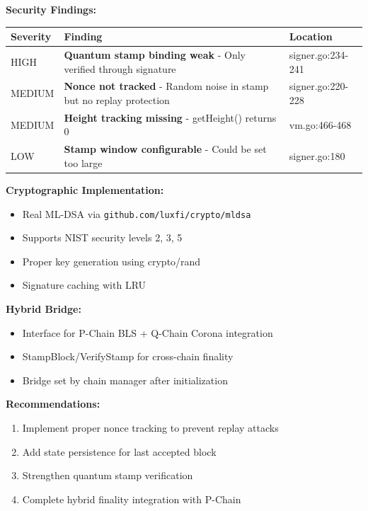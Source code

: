 \documentclass[
]{article}
\newcounter{none} %
\providecommand{\tightlist}{%
  \setlength{\itemsep}{0pt}\setlength{\parskip}{0pt}}
\begin{document}
\textbf{Security Findings:}

{\def\LTcaptype{none} %
\begin{longtable}[]{@{}lll@{}}
\toprule\noalign{}
Severity & Finding & Location \\
\midrule\noalign{}
\endhead
\bottomrule\noalign{}
\endlastfoot
HIGH & \textbf{Quantum stamp binding weak} - Only verified through
signature & signer.go:234-241 \\
MEDIUM & \textbf{Nonce not tracked} - Random noise in stamp but no
replay protection & signer.go:220-228 \\
MEDIUM & \textbf{Height tracking missing} - getHeight() returns 0 &
vm.go:466-468 \\
LOW & \textbf{Stamp window configurable} - Could be set too large &
signer.go:180 \\
\end{longtable}
}

\textbf{Cryptographic Implementation:}

\begin{itemize}
\tightlist
\item
  Real ML-DSA via \texttt{github.com/luxfi/crypto/mldsa}
\item
  Supports NIST security levels 2, 3, 5
\item
  Proper key generation using crypto/rand
\item
  Signature caching with LRU
\end{itemize}

\textbf{Hybrid Bridge:}

\begin{itemize}
\tightlist
\item
  Interface for P-Chain BLS + Q-Chain Corona integration
\item
  StampBlock/VerifyStamp for cross-chain finality
\item
  Bridge set by chain manager after initialization
\end{itemize}

\textbf{Recommendations:}

\begin{enumerate}
\def\labelenumi{\arabic{enumi}.}
\tightlist
\item
  Implement proper nonce tracking to prevent replay attacks
\item
  Add state persistence for last accepted block
\item
  Strengthen quantum stamp verification
\item
  Complete hybrid finality integration with P-Chain
\end{enumerate}
\end{document}
